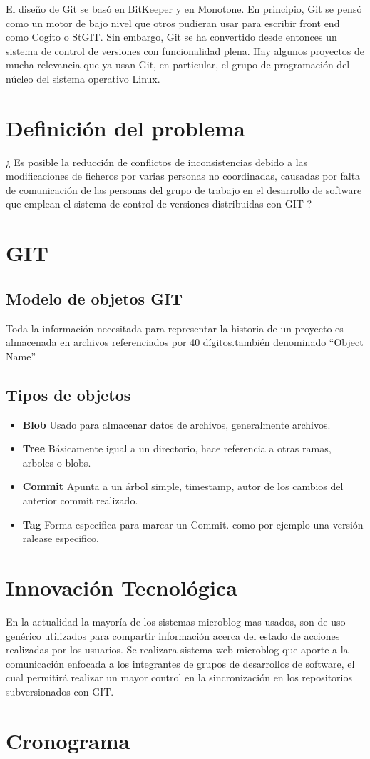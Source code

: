 \documentclass[letterpaper, 12pt,double,graphicx,caption,rotating]{report}
\begin{document}
El diseño de Git se basó en BitKeeper y en Monotone. En principio, Git se pensó como un motor de bajo nivel que otros pudieran usar para escribir front end como Cogito o StGIT. Sin embargo, Git se ha convertido desde entonces un sistema de control de versiones con funcionalidad plena. Hay algunos proyectos de mucha relevancia que ya usan Git, en particular, el grupo de programación del núcleo del sistema operativo Linux.

\section{Definición del problema}
¿ Es posible la reducción de conflictos de inconsistencias debido a las modificaciones de ficheros por varias personas no coordinadas,  causadas por falta de comunicación de las personas del grupo de trabajo en el desarrollo de software que emplean el sistema de control de versiones distribuidas con GIT ?

\section{GIT}
\subsection{Modelo de objetos GIT}
Toda la información necesitada para representar la historia de un proyecto es almacenada en archivos referenciados por 40 dígitos.también denominado ``Object Name''
\subsection{Tipos de objetos}
\begin{itemize}
 \item \textbf{Blob} Usado para almacenar datos de archivos, generalmente archivos.
 \item \textbf{Tree} Básicamente igual a un directorio, hace referencia a otras ramas, arboles o blobs.
 \item \textbf{Commit} Apunta a un árbol simple, timestamp, autor de los cambios del anterior commit realizado.
 \item \textbf{Tag} Forma especifica para marcar un Commit. como por ejemplo una versión ralease especifico.
\end{itemize}


\section{Innovación Tecnológica}
En la actualidad la mayoría de los sistemas microblog mas usados, son de uso genérico utilizados para compartir información acerca del estado de acciones realizadas por los usuarios. Se realizara sistema web microblog que aporte a la comunicación enfocada a los integrantes de grupos de desarrollos de software, el cual permitirá realizar un mayor control en la sincronización en los repositorios subversionados con GIT.

\section{Cronograma}


\end{document}
